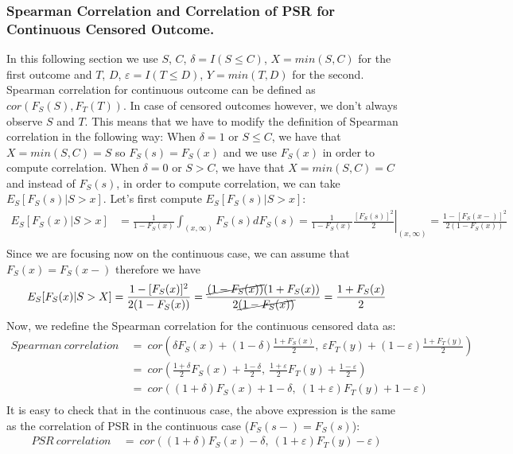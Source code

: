 \documentclass[]{article}
\let\epsilon\varepsilon
\begin{document}
\subsubsection{Spearman Correlation and Correlation of PSR for Continuous Censored Outcome.}
In this following section we use $S$, $C$, $\delta=I(S\leq C)$, $X = min(S, C)$ for the first outcome and $T$, $D$, $\epsilon=I(T\leq D)$, $Y = min(T, D)$ for the second.\\
Spearman correlation for continuous outcome can be defined as $cor(F_S(S), F_T(T))$. In case of censored outcomes however, we don't always observe $S$ and $T$. This means that we have to modify the definition of Spearman correlation in the following way: When $\delta = 1$ or $S\leq C$, we have that $X = min(S, C)=S$ so $F_S(s)=F_S(x)$ and we use $F_S(x)$ in order to compute correlation. When $\delta = 0$ or $S > C$, we have that $X = min(S, C)=C$ and instead of $F_S(s)$, in order to compute correlation, we can take $E_S[F_S(s)|S>x]$. Let's first compute $E_S[F_S(s)|S>x]$:
	$$
	\begin{aligned}
		E_S[F_S(x)|S>x] &= \frac{1}{1-F_S(x)}\int_{(x, \infty)} F_S(s)dF_S(s) = \frac{1}{1-F_S(x)} \left.\frac{ [F_S(s)]^2}{2}\right|_{(x, \infty)} = \frac{1-[F_S(x-)]^2}{2(1-F_S(x))} \\
	\end{aligned}
	$$
Since we are focusing now on the continuous case, we can assume that $F_S(x)=F_S(x-)$ therefore we have
	$$
	\begin{aligned}
		E_S[F_S(x)|S>X] &=\frac{1-[F_S(x)]^2}{2(1-F_S(x))}=\frac{\cancel{(1-F_S(x))}(1+F_S(x))}{2\cancel{(1-F_S(x))}}  = \frac{1+F_S(x)}{2} \\
	\end{aligned}
	$$
Now, we redefine the Spearman correlation for the continuous censored data as:
	$$
	\begin{aligned}
		Spearman~correlation~&=~ cor\left(  \delta F_S(x) + (1-\delta) \frac{1+F_S(x)}{2},~\epsilon F_T(y) + (1-\epsilon) \frac{1+F_T(y)}{2}  \right)\\
		&=~ cor\left(  \frac{1+\delta}{2}F_S(x) +  \frac{1-\delta}{2},~\frac{1+\epsilon}{2}F_T(y) +  \frac{1-\epsilon}{2}  \right)\\
		&=~ cor\left(  (1+\delta)F_S(x) +  1-\delta,~(1+\epsilon)F_T(y) +  1-\epsilon  \right)\\
	\end{aligned}
	$$
It is easy to check that in the continuous case, the above expression is the same as the correlation of PSR in the continuous case ($F_S(s-) = F_S(s)$): 
	$$
	\begin{aligned}
		PSR~correlation~&=~ cor\left(  (1+\delta)F_S(x) -\delta,~(1+\epsilon)F_T(y) -\epsilon  \right)\\
	\end{aligned}
	$$
\end{document}
